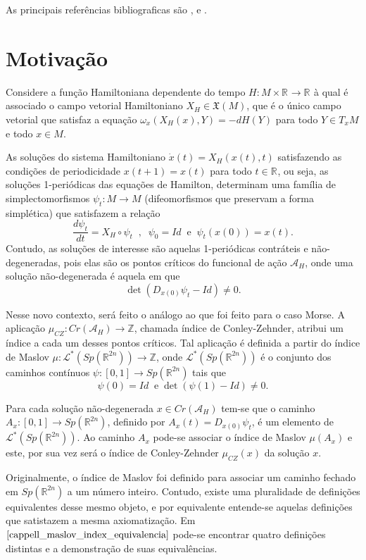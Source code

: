 \documentclass[12pt]{book}
\newcommand{\caminhosespeciais}[1]{\mathcal{L}^{*}(#1)}
\newcommand{\campohamiltoniano}[1]{X_{H}(#1)}
\newcommand{\campohamiltonianoabrev}{X_{H}}
\newcommand{\campossuaves}[1]{\mathfrak{X}(#1)}
\newcommand{\derivada}[2]{\frac{d #1}{d #2}}
\newcommand{\espacotangenteponto}[2]{T_{#1}#2}
\newcommand{\funcionalH}{\mathcal{A}_{H}}
\newcommand{\gruposimpletico}[1]{Sp(#1)}
\newcommand{\iconley}[1]{\iconleyabrev(#1)}
\newcommand{\iconleyabrev}{\mu_{CZ}}
\newcommand{\inteiros}{\mathbb{Z}}
\newcommand{\intervalo}{[0,1]}
\newcommand{\pontoscriticos}[1]{\textit{Cr}(#1)}
\newcommand{\real}[1]{\mathbb{R}^{#1}}
\newcommand{\reta}{\real{}}
\begin{document}
	As principais referências bibliograficas são \cite{audi_floer_homology}, \cite{salamon_conley_index} e \cite{salamon_zehnder} .
	
	\section{Motivação}
	Considere a função Hamiltoniana dependente do tempo $H:M\times \reta\to \reta$ à qual é associado o campo vetorial Hamiltoniano $X_{H} \in \campossuaves{M}$, que é o único campo vetorial que satisfaz a equação $\omega_{x}(\campohamiltoniano{x}, Y) = -dH(Y)$ para todo $Y \in \espacotangenteponto{x}{M}$ e todo $x \in M$. 
	
	As soluções do sistema Hamiltoniano $\dot{x}(t) = X_{H}(x(t), t)$ satisfazendo as condições de periodicidade $x(t+1) = x(t)$ para todo $t\in \reta$, ou seja, as soluções 1-periódicas das equações de Hamilton, determinam uma família de simplectomorfismos $\psi_{t}:M \to M$ (difeomorfismos que preservam a forma simplética) que satisfazem a relação 
	$$
	\derivada{\psi_{t}}{t}=\campohamiltonianoabrev\circ\psi_{t} \;\;, \;\; \psi_{0}=Id \;\;\text{e}\;\;  \psi_{t}(x(0)) = x(t).
	$$
	Contudo, as soluções de interesse são aquelas 1-periódicas contráteis e não-degeneradas, pois elas são os pontos críticos do funcional de ação $\funcionalH$, onde uma solução não-degenerada é aquela em que 
	$$
	\det(D_{x(0)}\psi_{t} -Id)\neq 0.
	$$
	
	
	Nesse novo contexto, será feito o análogo ao que foi feito para o caso Morse. A aplicação $\iconleyabrev:\pontoscriticos{\funcionalH} \to \inteiros$, chamada índice de Conley-Zehnder, atribui um índice a cada um desses pontos críticos. Tal aplicação é definida a partir do índice de Maslov $\mu:\caminhosespeciais{\gruposimpletico{\real{2n}}} \to \inteiros$, onde $\caminhosespeciais{\gruposimpletico{\real{2n}}}$ é o conjunto dos caminhos contínuos $\psi:\intervalo \to \gruposimpletico{\real{2n}}$ tais que 
	$$
	\psi(0)=Id\;\;\text{e}\;\det(\psi(1)-Id)\neq 0.
	$$
	
	Para cada solução não-degenerada $x \in \pontoscriticos{\funcionalH}$ tem-se que o caminho $A_{x}:\intervalo \to \gruposimpletico{\real{2n}}$, definido por $A_{x}(t) = D_{x(0)}\psi_{t} $, é um elemento de $\caminhosespeciais{\gruposimpletico{\real{2n}}}$. Ao caminho $A_{x}$ pode-se associar o índice de Maslov $\mu(A_{x})$ e este, por sua vez será o índice de Conley-Zehnder $\iconley{x}$ da solução $x$.
	
	Originalmente, o índice de Maslov foi definido para associar um caminho fechado em $\gruposimpletico{\real{2n}} $ a um número inteiro. Contudo, existe uma pluralidade de definições equivalentes desse mesmo objeto, e por equivalente entende-se aquelas definições que satistazem a mesma axiomatização. Em $\cite{cappell_maslov_index_equivalencia}$ pode-se encontrar quatro definições distintas e a demonstração de suas equivalências.
	
\end{document}
